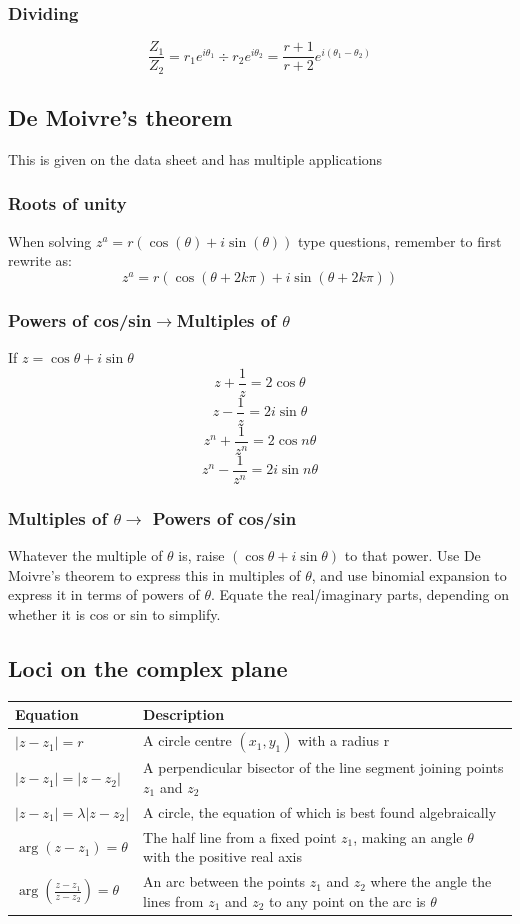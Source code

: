 \documentclass{article}[18pt]
\begin{document}
\subsubsection{Dividing}
$$\frac{Z_1}{Z_2}=r_1e^{i\theta_1}\div r_2e^{i\theta_2}=\frac{r+1}{r+2} e^{i(\theta_1-\theta_2)}$$
\subsection{De Moivre's theorem}
This is given on the data sheet and has multiple applications
\subsubsection{Roots of unity}
When solving $z^a=r(\cos(\theta)+i\sin(\theta))$ type questions, remember to first rewrite as:
$$z^a=r(\cos(\theta+2k\pi)+i\sin(\theta+2k\pi))$$
\subsubsection{Powers of cos/sin$\rightarrow$Multiples of $\theta$}
If $z=\cos\theta+i\sin\theta$
$$z+\frac{1}{z}=2\cos\theta$$
$$z-\frac{1}{z}=2i\sin\theta$$
$$z^n+\frac{1}{z^n}=2\cos n\theta$$
$$z^n-\frac{1}{z^n}=2i\sin n\theta$$
\subsubsection{Multiples of $\theta\rightarrow$ Powers of cos/sin}
Whatever the multiple of $\theta$ is, raise $(\cos\theta+i\sin\theta)$ to that power. Use De Moivre's theorem to express this in multiples of $\theta$, and use binomial expansion to express it in terms of powers of $\theta$. Equate the real/imaginary parts, depending on whether it is cos or sin to simplify.

\subsection{Loci on the complex plane}
{\renewcommand{\arraystretch}{2}
\begin{tabularx}{\textwidth}{|X|X|}
\hline
Equation&Description\\
\hline
{\Large$|z-z_1|=r$}&A circle centre $(x_1,y_1)$ with a radius r\\
\hline
{\Large$|z-z_1|=|z-z_2|$}&A perpendicular bisector of the line segment joining points $z_1$ and $z_2$\\
\hline
{\Large$|z-z_1|=\lambda|z-z_2|$}&A circle, the equation of which is best found algebraically\\
\hline
{\Large$\arg(z-z_1)=\theta$}&The half line from a fixed point $z_1$, making an angle $\theta$ with the positive real axis\\
\hline
{\Large$\arg(\frac{z-z_1}{z-z_2})=\theta$}&An arc between the points $z_1$ and $z_2$ where the angle the lines from $z_1$ and $z_2$ to any point on the arc is $\theta$\\
\hline
\end{tabularx}}
\end{document}
